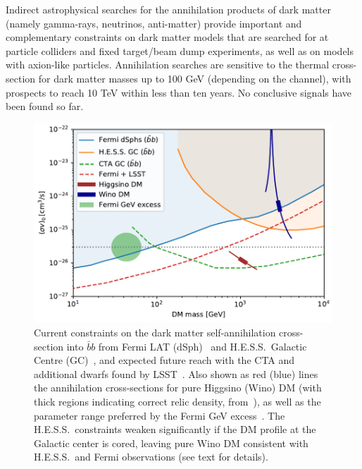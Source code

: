 \documentclass[../report.tex]{subfiles}
\begin{document}
Indirect astrophysical searches for the annihilation products of dark matter (namely gamma-rays, neutrinos, anti-matter) provide important and complementary constraints on dark matter models that are searched for at particle colliders and fixed target/beam dump experiments, as well as on models with axion-like particles.   Annihilation searches are sensitive to the thermal cross-section for dark matter masses up to 100 GeV (depending on the channel), with prospects to reach 10 TeV within less than ten years.  No conclusive signals have been found so far.

\begin{figure}
    \centering
    \includegraphics[width=0.8\linewidth]{Darkmatter/section1/img/ID.pdf}
    \caption{Current constraints on the dark matter self-annihilation cross-section into $\bar bb$ from Fermi LAT (dSph)~\cite{Albert2017-hn} and H.E.S.S.~Galactic Centre (GC)~\cite{Abdallah:2016ygi}, and expected future reach with the CTA and additional dwarfs found by LSST~\cite{Drlica-Wagner:2019xan}. 
    Also shown as red (blue) lines the annihilation cross-sections for pure Higgsino (Wino) DM (with thick regions indicating correct relic density, from~\cite{Ibe:2015tma}), as well as the parameter range preferred by the Fermi GeV excess~\cite{Ackermann:2017gx, Albert2017-hn}. The H.E.S.S.~constraints weaken significantly if the DM profile at the Galactic center is cored, leaving pure Wino DM consistent with H.E.S.S.~and Fermi observations (see text for details).}%
    \label{fig:ID}
\end{figure}
\end{document}
